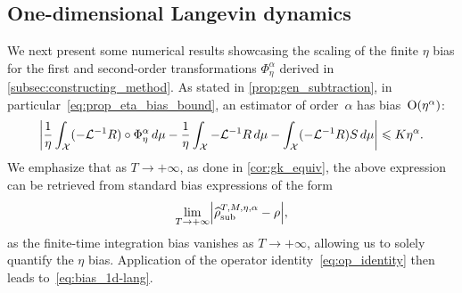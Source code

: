 \subsection{One-dimensional Langevin dynamics}
\label{subsec:num_1D}
%
%
%
We next present some numerical results showcasing the scaling of the finite $\eta$ bias for the first and second-order transformations $\Phi_\eta^\alpha$ derived in \cref{subsec:constructing_method}. As stated in \cref{prop:gen_subtraction}, in particular~\eqref{eq:prop_eta_bias_bound}, an estimator of order~$\alpha$ has bias~$\mathrm{O}(\eta^\alpha)$: 
%
\begin{equation}
    \abs*{\frac{1}{\eta}\int_\mathcal{X} (-\L^{-1}R) \circ \Phi_\eta^\alpha \, d\mu - \frac{1}{\eta}\int_\mathcal{X} -\L^{-1}R \, d\mu - \int_\mathcal{X} (-\L^{-1}R) S \, d\mu} \leq K\eta^{\alpha}.
    \label{eq:bias_1d-lang}
\end{equation}
%
We emphasize that as $T\to+\infty$, as done in \cref{cor:gk_equiv}, the above expression can be retrieved from standard bias expressions of the form
%
\begin{equation}
	\lim_{T\to+\infty} \abs*{\aTSest - \rho},
	\label{eq:std_bias}
\end{equation}
%
as the finite-time integration bias vanishes as $T\to+\infty$, allowing us to solely quantify the $\eta$ bias. Application of the operator identity~\eqref{eq:op_identity} then leads to~\eqref{eq:bias_1d-lang}.
%
